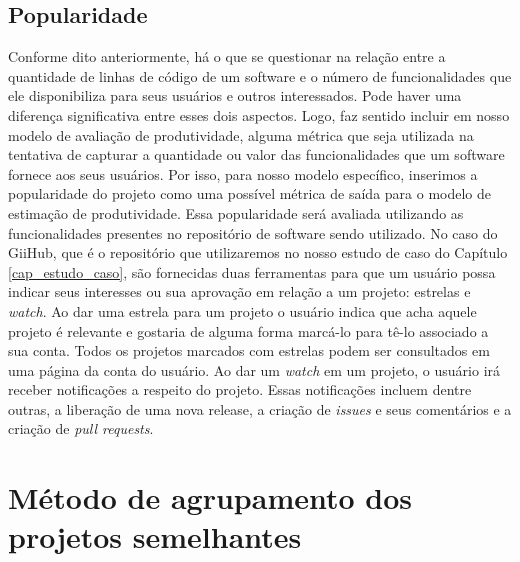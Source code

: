 \subsection{Popularidade}


Conforme dito anteriormente, há o que se questionar na relação entre a quantidade de linhas de código de um software e o número de funcionalidades que ele disponibiliza para seus usuários e outros interessados. Pode haver uma diferença significativa entre esses dois aspectos. Logo, faz sentido incluir em nosso modelo de avaliação de produtividade, alguma métrica que seja utilizada na tentativa de capturar a quantidade ou valor das funcionalidades que um software fornece aos seus usuários. Por isso, para nosso modelo específico, inserimos a popularidade do projeto como uma possível métrica de saída para o modelo de estimação de produtividade. Essa popularidade será avaliada utilizando as funcionalidades presentes no repositório de software sendo utilizado. No caso do GiiHub, que é o repositório que utilizaremos no nosso estudo de caso do Capítulo \ref{cap_estudo_caso}, são fornecidas duas ferramentas para que um usuário possa indicar seus interesses ou sua aprovação em relação a um projeto: estrelas e \textit{watch}. Ao dar uma estrela para um projeto o usuário indica que acha aquele projeto é relevante e gostaria de alguma forma marcá-lo para tê-lo associado a sua conta. Todos os projetos marcados com estrelas podem ser consultados em uma página da conta do usuário.  Ao dar um \textit{watch} em um projeto, o usuário irá receber notificações a respeito do projeto. Essas notificações incluem dentre outras, a liberação de uma nova release, a criação de \textit{issues} e seus comentários e a criação de \textit{pull requests}.


\section{Método de agrupamento dos projetos semelhantes}

